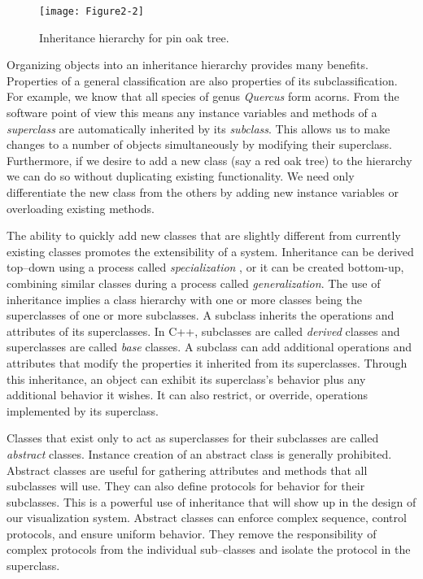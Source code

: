 \begin{figure}[!htb]
	\centering
	\texttt{[image: Figure2-2]}
	\caption{Inheritance hierarchy for pin oak tree.}
	\label{fig:Figure2-2}
\end{figure}

Organizing objects into an inheritance hierarchy provides many benefits. Properties of a general classification are also properties of its subclassification. For example, we know that all species of genus \emph{Quercus} form acorns. From the software point of view this means any instance variables and methods of a \emph{superclass} are automatically inherited by its \emph{subclass}. This allows us to make changes to a number of objects simultaneously by modifying their superclass. Furthermore, if we desire to add a new class (say a red oak tree) to the hierarchy we can do so without duplicating existing functionality. We need only differentiate the new class from the others by adding new instance variables or overloading existing methods.

The ability to quickly add new classes that are slightly different from currently existing classes promotes the extensibility of a system. Inheritance can be derived top--down using a process called \emph{specialization} , or it can be created bottom-up, combining similar classes during a process called \emph{generalization}. The use of inheritance implies a class hierarchy with one or more classes being the superclasses of one or more subclasses. A subclass inherits the operations and attributes of its superclasses. In C++, subclasses are called \emph{derived} classes and superclasses are called \emph{base} classes. A subclass can add additional operations and attributes that modify the properties it inherited from its superclasses. Through this inheritance, an object can exhibit its superclass's behavior plus any additional behavior it wishes. It can also restrict, or override, operations implemented by its superclass.

Classes that exist only to act as superclasses for their subclasses are called \emph{abstract} classes. Instance creation of an abstract class is generally prohibited. Abstract classes are useful for gathering attributes and methods that all subclasses will use. They can also define protocols for behavior for their subclasses. This is a powerful use of inheritance that will show up in the design of our visualization system. Abstract classes can enforce complex sequence, control protocols, and ensure uniform behavior. They remove the responsibility of complex protocols from the individual sub--classes and isolate the protocol in the superclass.

